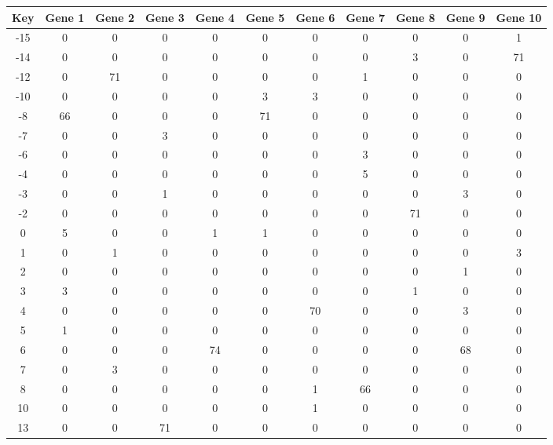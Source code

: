 \begin{tabular}{|c|c|c|c|c|c|c|c|c|c|c|}
\hline
Key & Gene 1 & Gene 2 & Gene 3 & Gene 4 & Gene 5 & Gene 6 & Gene 7 & Gene 8 & Gene 9 & Gene 10 \\
\hline
-15 & 0 & 0 & 0 & 0 & 0 & 0 & 0 & 0 & 0 & 1 \\
-14 & 0 & 0 & 0 & 0 & 0 & 0 & 0 & 3 & 0 & 71 \\
-12 & 0 & 71 & 0 & 0 & 0 & 0 & 1 & 0 & 0 & 0 \\
-10 & 0 & 0 & 0 & 0 & 3 & 3 & 0 & 0 & 0 & 0 \\
-8 & 66 & 0 & 0 & 0 & 71 & 0 & 0 & 0 & 0 & 0 \\
-7 & 0 & 0 & 3 & 0 & 0 & 0 & 0 & 0 & 0 & 0 \\
-6 & 0 & 0 & 0 & 0 & 0 & 0 & 3 & 0 & 0 & 0 \\
-4 & 0 & 0 & 0 & 0 & 0 & 0 & 5 & 0 & 0 & 0 \\
-3 & 0 & 0 & 1 & 0 & 0 & 0 & 0 & 0 & 3 & 0 \\
-2 & 0 & 0 & 0 & 0 & 0 & 0 & 0 & 71 & 0 & 0 \\
0 & 5 & 0 & 0 & 1 & 1 & 0 & 0 & 0 & 0 & 0 \\
1 & 0 & 1 & 0 & 0 & 0 & 0 & 0 & 0 & 0 & 3 \\
2 & 0 & 0 & 0 & 0 & 0 & 0 & 0 & 0 & 1 & 0 \\
3 & 3 & 0 & 0 & 0 & 0 & 0 & 0 & 1 & 0 & 0 \\
4 & 0 & 0 & 0 & 0 & 0 & 70 & 0 & 0 & 3 & 0 \\
5 & 1 & 0 & 0 & 0 & 0 & 0 & 0 & 0 & 0 & 0 \\
6 & 0 & 0 & 0 & 74 & 0 & 0 & 0 & 0 & 68 & 0 \\
7 & 0 & 3 & 0 & 0 & 0 & 0 & 0 & 0 & 0 & 0 \\
8 & 0 & 0 & 0 & 0 & 0 & 1 & 66 & 0 & 0 & 0 \\
10 & 0 & 0 & 0 & 0 & 0 & 1 & 0 & 0 & 0 & 0 \\
13 & 0 & 0 & 71 & 0 & 0 & 0 & 0 & 0 & 0 & 0 \\
\hline
\end{tabular}